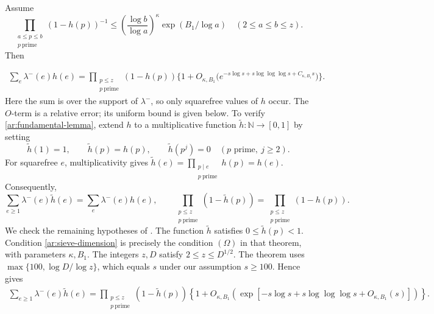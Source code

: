 \documentclass[twoside]{aomart}
\theoremstyle{paperplain}
\theoremstyle{paperdefinition}
\newcommand{\N}{\mathbb N}
\numberwithin{equation}{section}
\begin{document}
Assume
\begin{equation}
 \prod_{\substack{a\le p\le b\\p\ \mathrm{prime}}}(1-h(p))^{-1}
 \le\left(\frac{\log b}{\log a}\right)^\kappa
          \exp(B_1/\log a)\quad(2\le a\le b\le z).
 \label{ar:sieve-dimension}
\end{equation}
Then

\begin{equation}
 \begin{split}
 \sum_e\lambda^-(e)h(e)
 =\prod_{\substack{p\le z\\p\ \mathrm{prime}}}(1-h(p))
 \bigl\{1+O_{\kappa,B_1}\bigl(
 e^{-s\log s+s\log\log\log s+C_{\kappa,B_1}s}\bigr)\bigr\}.
 \end{split}
 \label{ar:fundamental-lemma}
\end{equation}
Here the sum is over the support of $\lambda^-$, so only
squarefree values of $h$ occur.
The $O$-term is a relative error; its uniform bound is given below.
To verify \eqref{ar:fundamental-lemma}, extend $h$ to a
multiplicative function $\widetilde h:\N\to[0,1]$ by setting
\begin{equation}
 \widetilde h(1)=1,\qquad \widetilde h(p)=h(p),\qquad
 \widetilde h(p^j)=0\quad(p\text{ prime},\ j\ge2).
\end{equation}
For squarefree $e$, multiplicativity gives
$\widetilde h(e)=\prod_{\substack{p\mid e\\p\ \mathrm{prime}}}h(p)=h(e)$.
Consequently,
\begin{equation}
 \sum_{e\ge1}\lambda^-(e)\widetilde h(e)=\sum_e\lambda^-(e)h(e),\qquad
 \prod_{\substack{p\le z\\p\ \mathrm{prime}}}(1-\widetilde h(p))=\prod_{\substack{p\le z\\p\ \mathrm{prime}}}(1-h(p)).
 \label{ar:sieve-extension-identities}
\end{equation}
We check the remaining hypotheses of
\cite[Theorem~3.6(a)]{FordSieve2023}.
The function $\widetilde h$ satisfies $0\le\widetilde h(p)<1$.
Condition \eqref{ar:sieve-dimension} is precisely the condition
$(\Omega)$ in that theorem, with parameters $\kappa,B_1$.
The integers $z,D$ satisfy $2\le z\le D^{1/2}$.
The theorem uses $\max\{100,\log D/\log z\}$, which equals
$s$ under our assumption $s\ge100$.
Hence \cite[Theorem~3.6(a), p.~38]{FordSieve2023} gives
\begin{equation}
 \begin{aligned}
 \sum_{e\ge1}\lambda^-(e)\widetilde h(e)
 =\prod_{\substack{p\le z\\p\ \mathrm{prime}}}(1-\widetilde h(p))
 \left\{1+O_{\kappa,B_1}\!\left(
 \exp\!\left[-s\log s+s\log\log\log s+O_{\kappa,B_1}(s)\right]
 \right)\right\}.
 \end{aligned}
 \label{ar:sieve-source-estimate}
\end{equation}
\end{document}

